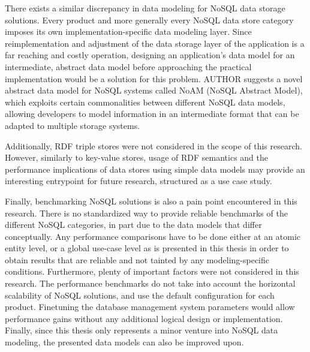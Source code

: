 There exists a similar discrepancy in data modeling for NoSQL data storage solutions.
Every product and more generally every NoSQL data store category imposes its own implementation-specific data modeling layer.
Since reimplementation and adjustment of the data storage layer of the application is a far reaching and costly operation, designing an application's data model for an intermediate, abstract data model before approaching the practical implementation would be a solution for this problem.
AUTHOR suggests a novel abstract data model for NoSQL systems called NoAM (NoSQL Abstract Model), which exploits certain commonalities between different NoSQL data models, allowing developers to model information in an intermediate format that can be adapted to multiple storage systems.

Additionally, RDF triple stores were not considered in the scope of this research.
However, similarly to key-value stores, usage of RDF semantics and the performance implications of data stores using simple data models may provide an interesting entrypoint for future research, structured as a use case study.

Finally, benchmarking NoSQL solutions is also a pain point encountered in this research.
There is no standardized way to provide reliable benchmarks of the different NoSQL categories, in part due to the data models that differ conceptually.
Any performance comparisons have to be done either at an atomic entity level, or a global use-case level as is presented in this thesis in order to obtain results that are reliable and not tainted by any modeling-specific conditions.
Furthermore, plenty of important factors were not considered in this research.
The performance benchmarks do not take into account the horizontal scalability of NoSQL solutions, and use the default configuration for each product.
Finetuning the database management system parameters would allow performance gains without any additional logical design or implementation.
Finally, since this thesis only represents a minor venture into NoSQL data modeling, the presented data models can also be improved upon.

